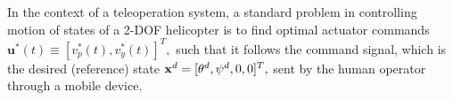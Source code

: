 In the context of a teleoperation system, a standard problem in controlling motion of states of a 2-DOF helicopter is to find optimal actuator commands $\mathbf{u}^*(t)\equiv[v_p^*(t),v_y^*(t)]^T,$ such that it follows the command signal, which is the desired (reference) state ${\bf x}^{d} = [\theta^{d},\psi^{d},0,0]^T,$ sent by the human operator through a mobile device. 






